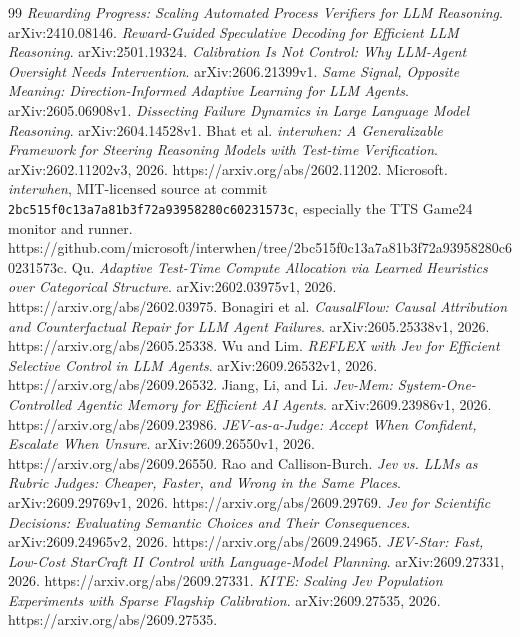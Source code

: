 \documentclass[11pt]{article}
\begin{document}
\begin{thebibliography}{99}
 \emph{Rewarding Progress: Scaling Automated Process Verifiers for LLM Reasoning}. arXiv:2410.08146.
 \emph{Reward-Guided Speculative Decoding for Efficient LLM Reasoning}. arXiv:2501.19324.
 \emph{Calibration Is Not Control: Why LLM-Agent Oversight Needs Intervention}. arXiv:2606.21399v1.
 \emph{Same Signal, Opposite Meaning: Direction-Informed Adaptive Learning for LLM Agents}. arXiv:2605.06908v1.
 \emph{Dissecting Failure Dynamics in Large Language Model Reasoning}. arXiv:2604.14528v1.
 Bhat et al. \emph{interwhen: A Generalizable Framework for Steering Reasoning Models with Test-time Verification}. arXiv:2602.11202v3, 2026. https://arxiv.org/abs/2602.11202.
 Microsoft. \emph{interwhen}, MIT-licensed source at commit \texttt{2bc515f0c13a7a81b3f72a93958280c60231573c}, especially the TTS Game24 monitor and runner. https://github.com/microsoft/interwhen/tree/2bc515f0c13a7a81b3f72a93958280c60231573c.
 Qu. \emph{Adaptive Test-Time Compute Allocation via Learned Heuristics over Categorical Structure}. arXiv:2602.03975v1, 2026. https://arxiv.org/abs/2602.03975.
 Bonagiri et al. \emph{CausalFlow: Causal Attribution and Counterfactual Repair for LLM Agent Failures}. arXiv:2605.25338v1, 2026. https://arxiv.org/abs/2605.25338.
 Wu and Lim. \emph{REFLEX with Jev for Efficient Selective Control in LLM Agents}. arXiv:2609.26532v1, 2026. https://arxiv.org/abs/2609.26532.
 Jiang, Li, and Li. \emph{Jev-Mem: System-One-Controlled Agentic Memory for Efficient AI Agents}. arXiv:2609.23986v1, 2026. https://arxiv.org/abs/2609.23986.
 \emph{JEV-as-a-Judge: Accept When Confident, Escalate When Unsure}. arXiv:2609.26550v1, 2026. https://arxiv.org/abs/2609.26550.
 Rao and Callison-Burch. \emph{Jev vs. LLMs as Rubric Judges: Cheaper, Faster, and Wrong in the Same Places}. arXiv:2609.29769v1, 2026. https://arxiv.org/abs/2609.29769.
 \emph{Jev for Scientific Decisions: Evaluating Semantic Choices and Their Consequences}. arXiv:2609.24965v2, 2026. https://arxiv.org/abs/2609.24965.
 \emph{JEV-Star: Fast, Low-Cost StarCraft II Control with Language-Model Planning}. arXiv:2609.27331, 2026. https://arxiv.org/abs/2609.27331.
 \emph{KITE: Scaling Jev Population Experiments with Sparse Flagship Calibration}. arXiv:2609.27535, 2026. https://arxiv.org/abs/2609.27535.

\end{thebibliography}
\end{document}
